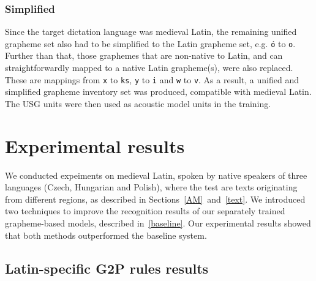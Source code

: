 \documentclass[runningheads,a4paper]{llncs}
\begin{document}
\subsubsection{Simplified}\label{simplified}
Since the target dictation language was medieval Latin, the remaining unified grapheme set also had to be simplified to the Latin grapheme set, e.g. \texttt{\'{o}} to \texttt{o}.
Further than that, those graphemes that are non-native to Latin, and can straightforwardly mapped to a native Latin grapheme(s), were also replaced.
These are mappings from \texttt{x} to \texttt{ks}, \texttt{y} to \texttt{i} and \texttt{w} to \texttt{v}.
As a result, a unified and simplified grapheme inventory set was produced, compatible with medieval Latin.
The USG units were then used as acoustic model units in the training.
\section{Experimental results}\label{results}
We conducted expeiments on medieval Latin, spoken by native speakers of three languages (Czech, Hungarian and Polish), where the test are texts originating from different regions, as described in Sections~\ref{AM}~and~\ref{text}.
We introduced two techniques to improve the recognition results of our separately trained grapheme-based models, described in~\ref{baseline}.
Our experimental results showed that both methods outperformed the baseline system.
\subsection{Latin-specific G2P rules results}
\end{document}
